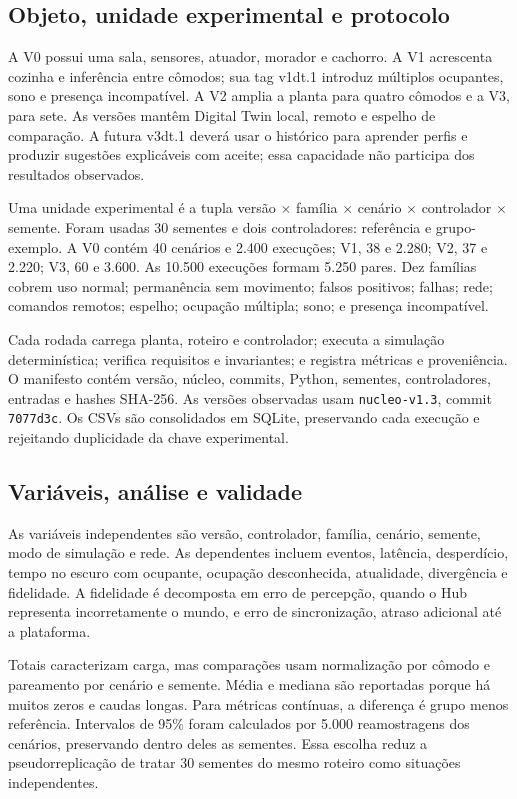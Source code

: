 \documentclass[10pt,a4paper]{article}
\begin{document}
\subsection{Objeto, unidade experimental e protocolo}

A V0 possui uma sala, sensores, atuador, morador e cachorro. A V1 acrescenta cozinha e inferência entre cômodos; sua tag v1dt.1 introduz múltiplos ocupantes, sono e presença incompatível. A V2 amplia a planta para quatro cômodos e a V3, para sete. As versões mantêm Digital Twin local, remoto e espelho de comparação. A futura v3dt.1 deverá usar o histórico para aprender perfis e produzir sugestões explicáveis com aceite; essa capacidade não participa dos resultados observados.

Uma unidade experimental é a tupla versão $\times$ família $\times$ cenário $\times$ controlador $\times$ semente. Foram usadas 30 sementes e dois controladores: referência e grupo-exemplo. A V0 contém 40 cenários e 2.400 execuções; V1, 38 e 2.280; V2, 37 e 2.220; V3, 60 e 3.600. As 10.500 execuções formam 5.250 pares. Dez famílias cobrem uso normal; permanência sem movimento; falsos positivos; falhas; rede; comandos remotos; espelho; ocupação múltipla; sono; e presença incompatível.

Cada rodada carrega planta, roteiro e controlador; executa a simulação determinística; verifica requisitos e invariantes; e registra métricas e proveniência. O manifesto contém versão, núcleo, commits, Python, sementes, controladores, entradas e hashes SHA-256. As versões observadas usam \texttt{nucleo-v1.3}, commit \texttt{7077d3c}. Os CSVs são consolidados em SQLite, preservando cada execução e rejeitando duplicidade da chave experimental.

\subsection{Variáveis, análise e validade}

As variáveis independentes são versão, controlador, família, cenário, semente, modo de simulação e rede. As dependentes incluem eventos, latência, desperdício, tempo no escuro com ocupante, ocupação desconhecida, atualidade, divergência e fidelidade. A fidelidade é decomposta em erro de percepção, quando o Hub representa incorretamente o mundo, e erro de sincronização, atraso adicional até a plataforma.

Totais caracterizam carga, mas comparações usam normalização por cômodo e pareamento por cenário e semente. Média e mediana são reportadas porque há muitos zeros e caudas longas. Para métricas contínuas, a diferença é grupo menos referência. Intervalos de 95\% foram calculados por 5.000 reamostragens dos cenários, preservando dentro deles as sementes. Essa escolha reduz a pseudorreplicação de tratar 30 sementes do mesmo roteiro como situações independentes.
\end{document}
